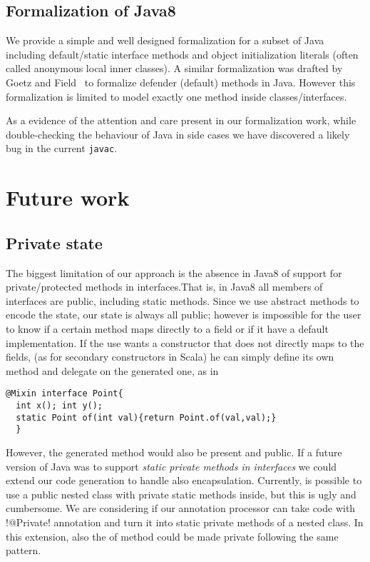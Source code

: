 \subsection{Formalization of Java8}
We provide a simple and well designed formalization for a subset of Java including default/static interface methods and object initialization literals (often called anonymous local inner classes).
A similar formalization was drafted by
Goetz and Field~\cite{goetz12fdefenders} to formalize defender (default) methods
in Java. However this formalization is limited to model exactly one
method inside classes/interfaces.

As a evidence of the attention and care present in our formalization work, while double-checking the behaviour of Java in side cases we have discovered a likely bug in the current \texttt{javac}.

\section{Future work}

\subsection{Private state}
The biggest limitation of our approach is the absence in Java8 of support for private/protected methods in interfaces.That is, in Java8 all members of interfaces are public, including static methods.
Since we use abstract methods to encode the state, our state is always all public; however is impossible for the user to know if a certain method maps directly to a field or if it have a default implementation.
If the use wants a constructor that does not directly maps to the fields, (as for secondary constructors in Scala) he can simply define its own \Q@of@ method and delegate on the generated one, as in
\begin{lstlisting}
@Mixin interface Point{
  int x(); int y();
  static Point of(int val){return Point.of(val,val);}  
  }
\end{lstlisting}
However, the generated \Q@of@ method would also be present and public.
If a future version of Java was to support \emph{static private methods in interfaces} we could extend our code generation to handle also encapsulation.
Currently, is possible to use a public nested class with private static methods inside, but this is ugly and cumbersome. We are considering if our annotation processor can take code with \Q!@Private! annotation and turn it into static private methods of a nested class. In this extension,  also the of method could be made private following the same pattern. 

